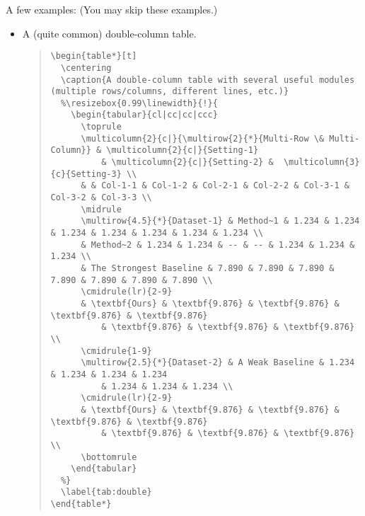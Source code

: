 
A few examples: (You may skip these examples.)

\begin{itemize}
  \item A (quite common) double-column table.
  \begin{quote}\begin{scriptsize}\begin{verbatim}
\begin{table*}[t]
  \centering
  \caption{A double-column table with several useful modules (multiple rows/columns, different lines, etc.)}
  %\resizebox{0.99\linewidth}{!}{
    \begin{tabular}{cl|cc|cc|ccc}
      \toprule
      \multicolumn{2}{c|}{\multirow{2}{*}{Multi-Row \& Multi-Column}} & \multicolumn{2}{c|}{Setting-1}
          & \multicolumn{2}{c|}{Setting-2} &  \multicolumn{3}{c}{Setting-3} \\
      & & Col-1-1 & Col-1-2 & Col-2-1 & Col-2-2 & Col-3-1 & Col-3-2 & Col-3-3 \\
      \midrule
      \multirow{4.5}{*}{Dataset-1} & Method~1 & 1.234 & 1.234 & 1.234 & 1.234 & 1.234 & 1.234 & 1.234 \\
      & Method~2 & 1.234 & 1.234 & -- & -- & 1.234 & 1.234 & 1.234 \\
      & The Strongest Baseline & 7.890 & 7.890 & 7.890 & 7.890 & 7.890 & 7.890 & 7.890 \\
      \cmidrule(lr){2-9}
      & \textbf{Ours} & \textbf{9.876} & \textbf{9.876} & \textbf{9.876} & \textbf{9.876}
          & \textbf{9.876} & \textbf{9.876} & \textbf{9.876} \\
      \cmidrule{1-9}
      \multirow{2.5}{*}{Dataset-2} & A Weak Baseline & 1.234 & 1.234 & 1.234 & 1.234
          & 1.234 & 1.234 & 1.234 \\
      \cmidrule(lr){2-9}
      & \textbf{Ours} & \textbf{9.876} & \textbf{9.876} & \textbf{9.876} & \textbf{9.876}
          & \textbf{9.876} & \textbf{9.876} & \textbf{9.876} \\
      \bottomrule
    \end{tabular}
  %}
  \label{tab:double}
\end{table*}
  \end{verbatim}\end{scriptsize}\end{quote}


\end{itemize}
